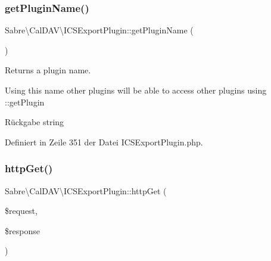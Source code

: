 \mbox{\label{class_sabre_1_1_cal_d_a_v_1_1_i_c_s_export_plugin_afd7ed0532a7cd549d8ab05e4d4ad18b6}} 
\subsubsection{\texorpdfstring{get\+Plugin\+Name()}{getPluginName()}}
{\footnotesize\ttfamily Sabre\textbackslash{}\+Cal\+D\+A\+V\textbackslash{}\+I\+C\+S\+Export\+Plugin\+::get\+Plugin\+Name (\begin{DoxyParamCaption}{ }\end{DoxyParamCaption})}

Returns a plugin name.

Using this name other plugins will be able to access other plugins using \+::get\+Plugin

\begin{DoxyReturn}{Rückgabe}
string 
\end{DoxyReturn}


Definiert in Zeile 351 der Datei I\+C\+S\+Export\+Plugin.\+php.

\mbox{\label{class_sabre_1_1_cal_d_a_v_1_1_i_c_s_export_plugin_aaea4a6e8e938f164a31b20639d10f025}} 
\subsubsection{\texorpdfstring{http\+Get()}{httpGet()}}
{\footnotesize\ttfamily Sabre\textbackslash{}\+Cal\+D\+A\+V\textbackslash{}\+I\+C\+S\+Export\+Plugin\+::http\+Get (\begin{DoxyParamCaption}\item[{\mbox{\hyperlink{interface_sabre_1_1_h_t_t_p_1_1_request_interface}{Request\+Interface}}}]{\$request,  }\item[{\mbox{\hyperlink{interface_sabre_1_1_h_t_t_p_1_1_response_interface}{Response\+Interface}}}]{\$response }\end{DoxyParamCaption})}

